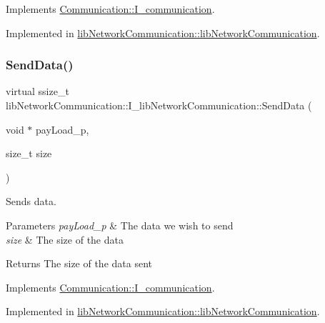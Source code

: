 Implements \mbox{\hyperlink{classCommunication_1_1I__communication_a48699762983e2bc64cc1e0642bf2e235}{Communication\+::\+I\+\_\+communication}}.



Implemented in \mbox{\hyperlink{classlibNetworkCommunication_1_1libNetworkCommunication_adbe327ebbc37c81231c3f9843300c778}{lib\+Network\+Communication\+::lib\+Network\+Communication}}.

\mbox{\label{classlibNetworkCommunication_1_1I__libNetworkCommunication_add643ce010a3712f9097dc36f45bfd50}} 
\subsubsection{\texorpdfstring{SendData()}{SendData()}}
{\footnotesize\ttfamily virtual ssize\+\_\+t lib\+Network\+Communication\+::\+I\+\_\+lib\+Network\+Communication\+::\+Send\+Data (\begin{DoxyParamCaption}\item[{void $\ast$}]{pay\+Load\+\_\+p,  }\item[{size\+\_\+t}]{size }\end{DoxyParamCaption})\hspace{0.3cm}{\ttfamily [pure virtual]}}



Sends data. 


\begin{DoxyParams}{Parameters}
{\em pay\+Load\+\_\+p} & The data we wish to send \\
\hline
{\em size} & The size of the data \\
\hline
\end{DoxyParams}
\begin{DoxyReturn}{Returns}
The size of the data sent 
\end{DoxyReturn}


Implements \mbox{\hyperlink{classCommunication_1_1I__communication_ad25474a90b1bf2789e9ab6ff57b3406e}{Communication\+::\+I\+\_\+communication}}.



Implemented in \mbox{\hyperlink{classlibNetworkCommunication_1_1libNetworkCommunication_a250d34be8725b543412b792e375972ac}{lib\+Network\+Communication\+::lib\+Network\+Communication}}.

